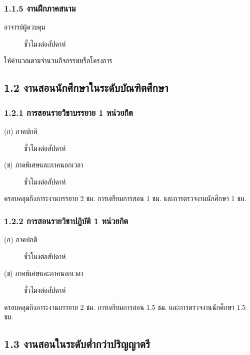 \documentclass[a4paper,12pt,english]{sphinxmanual}
\begin{document}
\subsubsection{1.1.5 งานฝึกภาคสนาม}
\label{\detokenize{workload_rubric:id8}}\begin{description}
\item[{อาจารย์ผู้ควบคุม}]  ชั่วโมงต่อสัปดาห์

\end{description}

ให้คำนวณตามจำนวนกิจกรรมหรือโครงการ


\subsection{1.2 งานสอนนักศึกษาในระดับบัณฑิตศึกษา}
\label{\detokenize{workload_rubric:id9}}

\subsubsection{1.2.1 การสอนรายวิชาบรรยาย 1 หน่วยกิต}
\label{\detokenize{workload_rubric:id10}}\begin{description}
\item[{(ก) ภาคปกติ}]  ชั่วโมงต่อสัปดาห์

\item[{(ข) ภาคพิเศษและภาคนอกเวลา}]  ชั่วโมงต่อสัปดาห์

\end{description}

ครอบคลุมถึงภาระงานบรรยาย 2 ชม. การเตรียมการสอน 1 ชม. และการตรวจงานนักศึกษา 1 ชม.


\subsubsection{1.2.2 การสอนรายวิชาปฏิบัติ 1 หน่วยกิต}
\label{\detokenize{workload_rubric:id11}}\begin{description}
\item[{(ก) ภาคปกติ}]  ชั่วโมงต่อสัปดาห์

\item[{(ข) ภาคพิเศษและภาคนอกเวลา}]  ชั่วโมงต่อสัปดาห์

\end{description}

ครอบคลุมถึงภาระงานบรรยาย 2 ชม.
การเตรียมการสอน 1.5 ชม. และการตรวจงานนักศึกษา 1.5 ชม.


\subsection{1.3 งานสอนในระดับต่ำกว่าปริญญาตรี}
\label{\detokenize{workload_rubric:id12}}
\end{document}
